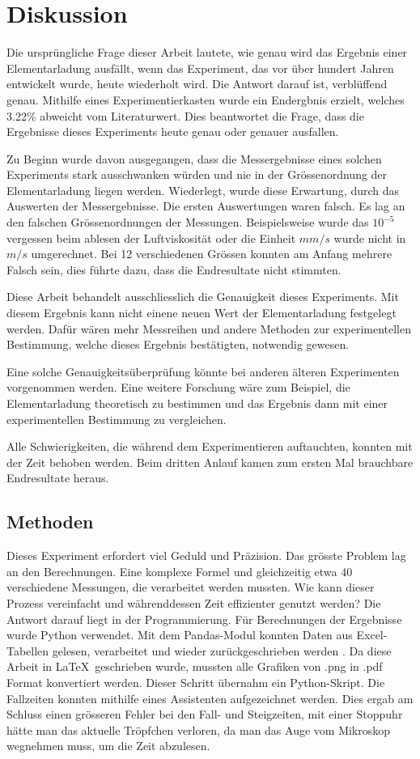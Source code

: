 \chapter{Diskussion}\label{cha:fazit}
Die ursprüngliche Frage dieser Arbeit lautete, wie genau wird das Ergebnis einer Elementarladung ausfällt, wenn das Experiment, das vor über hundert Jahren entwickelt wurde, heute wiederholt wird. Die Antwort darauf ist, verblüffend genau. Mithilfe eines Experimentierkasten wurde ein Endergbnis erzielt, welches 3.22\% abweicht vom Literaturwert. Dies beantwortet die Frage, dass die Ergebnisse dieses Experiments heute genau oder genauer ausfallen.

Zu Beginn wurde davon ausgegangen, dass die Messergebnisse eines solchen Experiments stark ausschwanken würden und nie in der Grössenordnung der Elementarladung liegen werden. Wiederlegt, wurde diese Erwartung, durch das Auswerten der Messergebnisse. Die ersten Auswertungen waren falsch. Es lag an den falschen Grössenordnungen der Messungen. Beispielsweise wurde das $10^{-5}$ vergessen beim ablesen der Luftviskosität oder die Einheit $mm/s$ wurde nicht in $m/s$ umgerechnet. Bei 12 verschiedenen Grössen konnten am Anfang mehrere Falsch sein, dies führte dazu, dass die Endresultate nicht stimmten.

Diese Arbeit behandelt ausschliesslich die Genauigkeit dieses Experiments. Mit diesem Ergebnis kann nicht einene neuen Wert der Elementarladung festgelegt werden. Dafür wären mehr Messreihen und andere Methoden zur experimentellen Bestimmung, welche dieses Ergebnis bestätigten, notwendig gewesen. 

Eine solche Genauigkeitsüberprüfung könnte bei anderen älteren Experimenten vorgenommen werden. Eine weitere Forschung wäre zum Beispiel, die Elementarladung theoretisch zu bestimmen und das Ergebnis dann mit einer experimentellen Bestimmung zu vergleichen.

Alle Schwierigkeiten, die während dem Experimentieren auftauchten, konnten mit der Zeit behoben werden. Beim dritten Anlauf kamen zum ersten Mal brauchbare Endresultate heraus. 

\section{Methoden}\label{sec:methoden}
Dieses Experiment erfordert viel Geduld und Präzision. Das grösste Problem lag an den Berechnungen. Eine komplexe Formel und gleichzeitig etwa 40 verschiedene Messungen, die verarbeitet werden mussten. Wie kann dieser Prozess vereinfacht und währenddessen Zeit effizienter genutzt werden? Die Antwort darauf liegt in der Programmierung. Für Berechnungen der Ergebnisse wurde Python verwendet. Mit dem Pandas-Modul konnten Daten aus Excel-Tabellen gelesen, verarbeitet und wieder zurückgeschrieben werden \parencite[vgl.]{Inc_2024}. 
Da diese Arbeit in \LaTeX~geschrieben wurde, mussten alle Grafiken von .png in .pdf Format konvertiert werden. Dieser Schritt übernahm ein Python-Skript. Die Fallzeiten konnten mithilfe eines Assistenten aufgezeichnet werden. Dies ergab am Schluss einen grösseren Fehler bei den Fall- und Steigzeiten, mit einer Stoppuhr hätte man das aktuelle Tröpfchen verloren, da man das Auge vom Mikroskop wegnehmen muss, um die Zeit abzulesen. 

